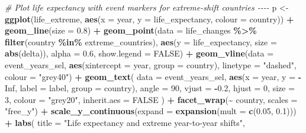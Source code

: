 \documentclass[
  11pt,
]{article}
\newenvironment{Shaded}{\begin{snugshade}}{\end{snugshade}}
\newcommand{\AttributeTok}[1]{\textcolor[rgb]{0.13,0.29,0.53}{#1}}
\newcommand{\CommentTok}[1]{\textcolor[rgb]{0.56,0.35,0.01}{\textit{#1}}}
\newcommand{\ConstantTok}[1]{\textcolor[rgb]{0.56,0.35,0.01}{#1}}
\newcommand{\DecValTok}[1]{\textcolor[rgb]{0.00,0.00,0.81}{#1}}
\newcommand{\FloatTok}[1]{\textcolor[rgb]{0.00,0.00,0.81}{#1}}
\newcommand{\FunctionTok}[1]{\textcolor[rgb]{0.13,0.29,0.53}{\textbf{#1}}}
\newcommand{\NormalTok}[1]{#1}
\newcommand{\OtherTok}[1]{\textcolor[rgb]{0.56,0.35,0.01}{#1}}
\newcommand{\SpecialCharTok}[1]{\textcolor[rgb]{0.81,0.36,0.00}{\textbf{#1}}}
\newcommand{\StringTok}[1]{\textcolor[rgb]{0.31,0.60,0.02}{#1}}
\begin{document}
\begin{Shaded}
\begin{Highlighting}[]
\CommentTok{\# Plot life expectancy with event markers for extreme{-}shift countries {-}{-}{-}{-}}
\NormalTok{p }\OtherTok{\textless{}{-}} \FunctionTok{ggplot}\NormalTok{(life\_extreme, }\FunctionTok{aes}\NormalTok{(}\AttributeTok{x =}\NormalTok{ year, }\AttributeTok{y =}\NormalTok{ life\_expectancy, }\AttributeTok{colour =}\NormalTok{ country)) }\SpecialCharTok{+}
  \FunctionTok{geom\_line}\NormalTok{(}\AttributeTok{size =} \FloatTok{0.8}\NormalTok{) }\SpecialCharTok{+}
  \FunctionTok{geom\_point}\NormalTok{(}\AttributeTok{data =}\NormalTok{ life\_changes }\SpecialCharTok{\%\textgreater{}\%} \FunctionTok{filter}\NormalTok{(country }\SpecialCharTok{\%in\%}\NormalTok{ extreme\_countries),}
             \FunctionTok{aes}\NormalTok{(}\AttributeTok{y =}\NormalTok{ life\_expectancy, }\AttributeTok{size =} \FunctionTok{abs}\NormalTok{(delta)),}
             \AttributeTok{alpha =} \FloatTok{0.6}\NormalTok{, }\AttributeTok{show.legend =} \ConstantTok{FALSE}\NormalTok{) }\SpecialCharTok{+}
  \FunctionTok{geom\_vline}\NormalTok{(}\AttributeTok{data =}\NormalTok{ event\_years\_sel,}
             \FunctionTok{aes}\NormalTok{(}\AttributeTok{xintercept =}\NormalTok{ year, }\AttributeTok{group =}\NormalTok{ country),}
             \AttributeTok{linetype =} \StringTok{"dashed"}\NormalTok{, }\AttributeTok{colour =} \StringTok{"grey40"}\NormalTok{) }\SpecialCharTok{+}
  \FunctionTok{geom\_text}\NormalTok{(}
    \AttributeTok{data =}\NormalTok{ event\_years\_sel,}
    \FunctionTok{aes}\NormalTok{(}\AttributeTok{x =}\NormalTok{ year, }\AttributeTok{y =} \SpecialCharTok{{-}}\ConstantTok{Inf}\NormalTok{, }\AttributeTok{label =}\NormalTok{ label, }\AttributeTok{group =}\NormalTok{ country),}
    \AttributeTok{angle =} \DecValTok{90}\NormalTok{, }\AttributeTok{vjust =} \SpecialCharTok{{-}}\FloatTok{0.2}\NormalTok{, }\AttributeTok{hjust =} \DecValTok{0}\NormalTok{,}
    \AttributeTok{size =} \DecValTok{3}\NormalTok{, }\AttributeTok{colour =} \StringTok{"grey20"}\NormalTok{,}
    \AttributeTok{inherit.aes =} \ConstantTok{FALSE}
\NormalTok{  ) }\SpecialCharTok{+}
  \FunctionTok{facet\_wrap}\NormalTok{(}\SpecialCharTok{\textasciitilde{}}\NormalTok{ country, }\AttributeTok{scales =} \StringTok{"free\_y"}\NormalTok{) }\SpecialCharTok{+}
  \FunctionTok{scale\_y\_continuous}\NormalTok{(}\AttributeTok{expand =} \FunctionTok{expansion}\NormalTok{(}\AttributeTok{mult =} \FunctionTok{c}\NormalTok{(}\FloatTok{0.05}\NormalTok{, }\FloatTok{0.1}\NormalTok{))) }\SpecialCharTok{+}
  \FunctionTok{labs}\NormalTok{(}
    \AttributeTok{title =} \StringTok{"Life expectancy and extreme year{-}to{-}year shifts"}\NormalTok{,}

\end{Highlighting}
\end{Shaded}
\end{document}
